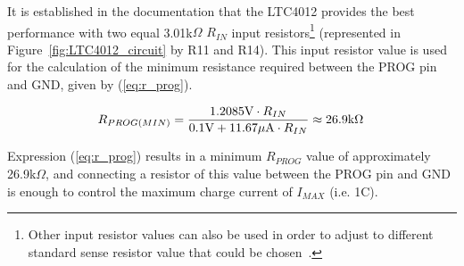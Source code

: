 It is established in the documentation that the LTC4012 provides the best performance with two equal 3.01k$\Omega$ $R_{IN}$ input resistors\footnote[8]{Other input resistor values can also be used in order to adjust to different standard sense resistor value that could be chosen~\cite{LTC4012}.} (represented in Figure~\ref{fig:LTC4012_circuit} by R11 and R14). This input resistor value is used for the calculation of the minimum resistance required between the PROG pin and \gls{GND}, given by (\ref{eq:r_prog}).

\begin{equation}\label{eq:r_prog}
    R_{PROG (MIN)}=\frac{1.2085 \textrm{V} \cdot R_{IN}}{0.1 \textrm{V} + 11.67 \mu \textrm{A} \cdot R_{IN}} \approx 26.9 \textrm{k}\Omega \,\medskip
\end{equation}

\noindent Expression (\ref{eq:r_prog}) results in a minimum $R_{PROG}$ value of approximately 26.9k$\Omega$, and connecting a resistor of this value between the PROG pin and GND is enough to control the maximum charge current of $I_{MAX}$ (i.e. 1C).


